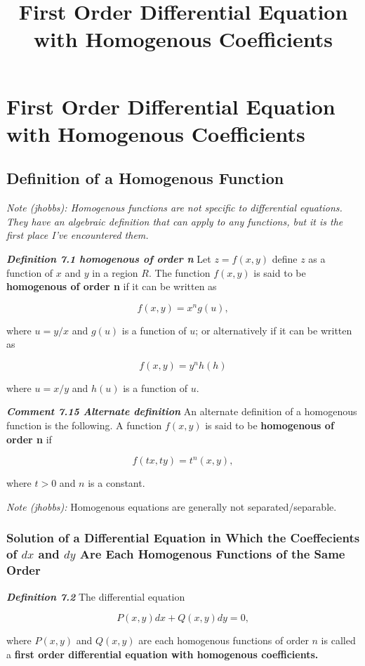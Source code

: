 \documentclass{article}
\title{First Order Differential Equation with Homogenous Coefficients}
\begin{document}
\section{First Order Differential Equation with Homogenous Coefficients}

\subsection{Definition of a Homogenous Function}

\emph{Note (jhobbs): Homogenous functions are not specific to differential equations. They have an algebraic definition that can apply to any functions, but it is the first place I've encountered them.}

\emph{\textbf{Definition 7.1 homogenous of order n}}
Let $z = f(x,y)$ define $z$ as a function of $x$ and $y$ in a region $R$. The function $f(x,y)$ is said to be \textbf{homogenous of order n} if it can be written as

\[ f(x,y) = x^ng(u), \tag{7.11} \]

where $u = y/x$ and $g(u)$ is a function of $u$; or alternatively if it can be written as

\[ f(x,y) = y^nh(h) \tag{7.12} \]

where $u = x/y$ and $h(u)$ is a function of $u$.

\emph{\textbf{Comment 7.15 Alternate definition}}
An alternate definition of a homogenous function is the following. A function $f(x,y)$ is said to be \textbf{homogenous of order n} if

\[ f(tx,ty) = t^n(x,y), \tag{7.16} \]

where $t > 0$ and $n$ is a constant.

\emph{Note (jhobbs):} Homogenous equations are generally not separated/separable.

\subsubsection{Solution of a Differential Equation in Which the Coeffecients of $dx$ and $dy$ Are Each Homogenous Functions of the Same Order}

\emph{\textbf{Definition 7.2}}
The differential equation

\[ P(x,y)dx + Q(x,y)dy = 0, \tag{7.3} \]

where $P(x,y)$ and $Q(x,y)$ are each homogenous functions of order $n$ is called a \textbf{first order differential equation with homogenous coefficients.}
\end{document}
